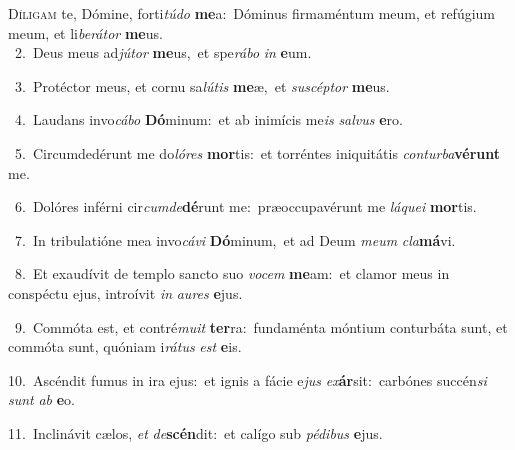 \lettrine{\initial\textcolor{\initialcolor}{D}}{íligam} te, Dómine, forti\-\textit{tú}\-\textit{do} \textbf{me}\-a:~\star Dóminus firmaméntum meum, et refúgium meum, et li\-\textit{be}\-\textit{rá}\textit{tor} \textbf{me}\-us.\\
{\numbfont\textcolor{\numbcolor}{~2.}}~Deus meus ad\-\textit{jú}\-\textit{tor} \textbf{me}\-us,~\star et spe\-\textit{rá}\-\textit{bo} \textit{in} \textbf{e}\-um.\par
{\numbfont\textcolor{\numbcolor}{~3.}}~Protéctor meus, et cornu sa\-\textit{lú}\-\textit{tis} \textbf{me}\-æ,~\star et \textit{su}\-\textit{scép}\textit{tor} \textbf{me}\-us.\par
{\numbfont\textcolor{\numbcolor}{~4.}}~Laudans invo\-\textit{cá}\-\textit{bo} \textbf{Dó}\-minum:~\star et ab inimícis me\textit{is} \textit{sal}\-\textit{vus} \textbf{e}\-ro.\par
{\numbfont\textcolor{\numbcolor}{~5.}}~Circumdedérunt me do\-\textit{ló}\-\textit{res} \textbf{mor}\-tis:~\star et torréntes iniquitátis \textit{con}\-\textit{tur}\textit{ba}\textbf{vé}\textbf{runt} me.\par
{\numbfont\textcolor{\numbcolor}{~6.}}~Dolóres inférni cir\-\textit{cum}\-\textit{de}\textbf{dé}runt me:~\star præoccupavérunt me \textit{lá}\-\textit{que}\textit{i} \textbf{mor}\-tis.\par
{\numbfont\textcolor{\numbcolor}{~7.}}~In tribulatióne mea invo\-\textit{cá}\-\textit{vi} \textbf{Dó}\-minum,~\star et ad Deum \textit{me}\-\textit{um} \textit{cla}\-\textbf{má}vi.\par
{\numbfont\textcolor{\numbcolor}{~8.}}~Et exaudívit de templo sancto suo \textit{vo}\-\textit{cem} \textbf{me}\-am:~\star et clamor meus in conspéctu ejus, introívit \textit{in} \textit{au}\-\textit{res} \textbf{e}\-jus.\par
{\numbfont\textcolor{\numbcolor}{~9.}}~Commóta est, et contré\-\textit{mu}\-\textit{it} \textbf{ter}\-ra:~\star fundaménta móntium conturbáta sunt, et commóta sunt, quóniam i\-\textit{rá}\-\textit{tus} \textit{est} \textbf{e}\-is.\par
{\numbfont\textcolor{\numbcolor}{10.}}~Ascéndit fumus in ira ejus:~\dagger et ignis a fácie e\textit{jus} \textit{ex}\-\textbf{ár}sit:~\star carbónes succén\textit{si} \textit{sunt} \textit{ab} \textbf{e}\-o.\par
{\numbfont\textcolor{\numbcolor}{11.}}~Inclinávit cælos, \textit{et} \textit{de}\-\textbf{scén}dit:~\star et calígo sub \textit{pé}\-\textit{di}\textit{bus} \textbf{e}\-jus.\par
